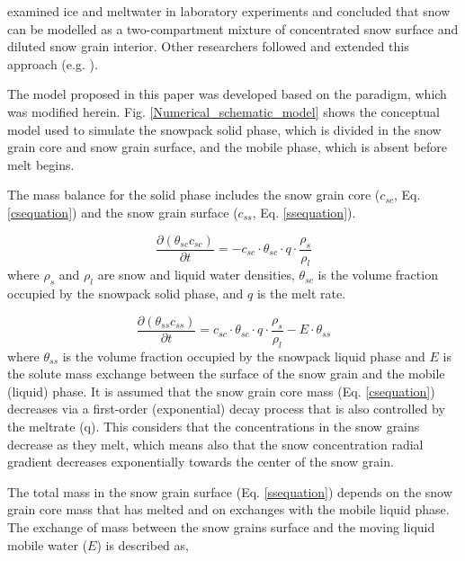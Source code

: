 \documentclass[authoryear,preprint,review,12pt]{elsarticle}
\begin{document}
\citet{Brimblecombe1987} examined ice and meltwater in laboratory experiments and concluded that snow can be modelled as a two-compartment mixture of concentrated snow surface and diluted snow grain interior. Other researchers followed and extended this approach (e.g. \citet{Bales1991,Harrington1998}). \par

The model proposed in this paper was developed based on the \citet{Harrington1998} paradigm, which was modified herein. Fig. \ref{Numerical_schematic_model} shows the conceptual model used to simulate the snowpack solid phase, which is divided in the snow grain core and snow grain surface, and the mobile phase, which is absent before melt begins.

The mass balance for the solid phase includes the snow grain core ($c_{sc}$, Eq. \ref{csequation}) and the snow grain surface ($c_{ss}$, Eq. \ref{ssequation}).

\begin{equation}
\dfrac{\partial (\theta_{sc} c_{sc})}{\partial t} = - c_{sc} \cdot \theta_{sc} \cdot q \cdot \dfrac{\rho_s}{\rho_l} 
\label{csequation}
\end{equation}
\noindent where $\rho_s$ and $\rho_l$ are snow and liquid water densities, $\theta_{sc}$ is the volume fraction occupied by the snowpack solid phase, and $q$ is the melt rate.

\begin{equation}
\dfrac{\partial (\theta_{ss} c_{ss})}{\partial t} = c_{sc} \cdot \theta_{sc} \cdot q \cdot \dfrac{\rho_s}{\rho_l} - E \cdot \theta_{ss}
\label{ssequation}
\end{equation}
\noindent where $\theta_{ss}$ is the volume fraction occupied by the snowpack liquid phase and $E$ is the solute mass exchange between the surface of the snow grain and the mobile (liquid) phase. It is assumed that the snow grain core mass (Eq. \ref{csequation}) decreases via a first-order (exponential) decay process that is also controlled by the meltrate (q). This considers that the concentrations in the snow grains decrease as they melt, which means also that the snow concentration radial gradient decreases exponentially towards the center of the snow grain. \par

The total mass in the snow grain surface (Eq. \ref{ssequation}) depends on the snow grain core mass that has melted and on exchanges with the mobile liquid phase. The exchange of mass between the snow grains surface and the moving liquid mobile water ($E$) is described as,
\end{document}
